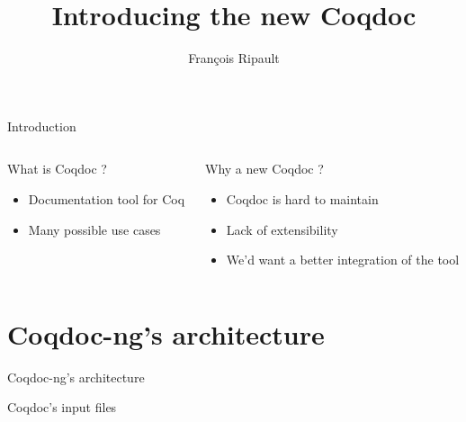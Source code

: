 \documentclass[compress]{beamer}
\title{Introducing the new Coqdoc}
\author{François Ripault}
\begin{document}
\begin{frame}
\titlepage
\end{frame}

\begin{frame}{Introduction}
  \begin{columns}[2]
    \begin{column}{0.5\textwidth}
      What is Coqdoc ?
      \begin{itemize}
        \item Documentation tool for Coq
        \item Many possible use cases
      \end{itemize}
    \end{column}
    \begin{column}{0.5\textwidth}
      Why a new Coqdoc ?
      \begin{itemize}
        \item Coqdoc is hard to maintain
        \item Lack of extensibility
        \item We'd want a better integration of the tool
      \end{itemize}
    \end{column}
  \end{columns}
\end{frame}

\begin{frame}
    \tableofcontents
\end{frame}

\section{Coqdoc-ng's architecture}
  \begin{frame}{Coqdoc-ng's architecture}
    
  \end{frame}
  \begin{frame}[containsverbatim]{Coqdoc's input files}
    
    \end{frame}
\end{document}
